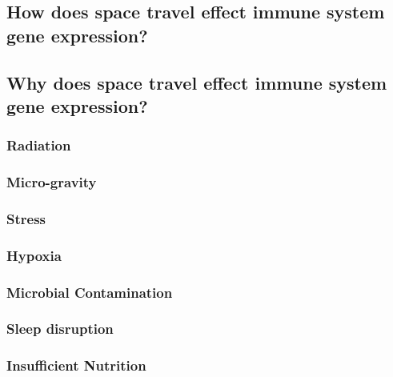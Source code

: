 \subsection{How does space travel effect immune system gene expression?}
\subsection{Why does space travel effect immune system gene expression?}
\subsubsection{Radiation}
\subsubsection{Micro-gravity} 
\subsubsection{Stress}
\subsubsection{Hypoxia}
\subsubsection{Microbial Contamination}
\subsubsection{Sleep disruption}
\subsubsection{Insufficient Nutrition}